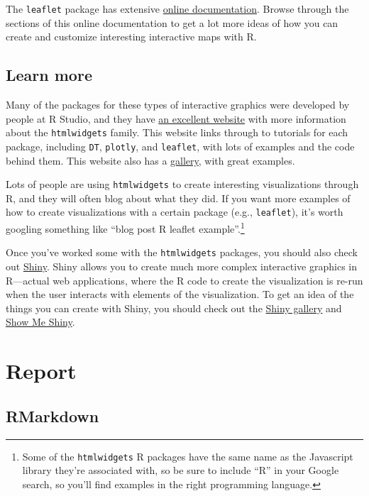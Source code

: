 \documentclass[]{tufte-book}
\begin{document}
The \texttt{leaflet} package has extensive \href{https://rstudio.github.io/leaflet/}{online documentation}.
Browse through the sections of this online documentation to get a lot more ideas of how you can
create and customize interesting interactive maps with R.

\hypertarget{learn-more-2}{%
\section{Learn more}\label{learn-more-2}}

Many of the packages for these types of interactive graphics were developed by people
at R Studio, and they have \href{https://www.htmlwidgets.org/}{an excellent website}
with more information about the
\texttt{htmlwidgets} family. This website links through to tutorials for each package, including
\texttt{DT}, \texttt{plotly}, and \texttt{leaflet}, with lots of examples and the code behind them.
This website also has a \href{http://gallery.htmlwidgets.org/}{gallery}, with great examples.

Lots of people are using \texttt{htmlwidgets} to create interesting visualizations through R,
and they will often blog about what they did. If you want more examples of how to
create visualizations with a certain package (e.g., \texttt{leaflet}), it's worth googling
something like ``blog post R leaflet example''.\footnote{Some of the \texttt{htmlwidgets} R packages
  have the same name as the Javascript library they're associated with, so be sure to
  include ``R'' in your Google search, so you'll find examples in the right programming
  language.}

Once you've worked some with the \texttt{htmlwidgets} packages, you should also check out
\href{https://shiny.rstudio.com/}{Shiny}. Shiny allows you to create much more complex
interactive graphics in R---actual
web applications, where the R code to create the visualization is re-run when the user
interacts with elements of the visualization. To get an idea of the things you can
create with Shiny, you should check out the \href{https://shiny.rstudio.com/gallery/}{Shiny gallery}
and \href{https://www.showmeshiny.com/}{Show Me Shiny}.

\hypertarget{report}{%
\chapter{Report}\label{report}}

\hypertarget{rmarkdown}{%
\section{RMarkdown}\label{rmarkdown}}
\end{document}
